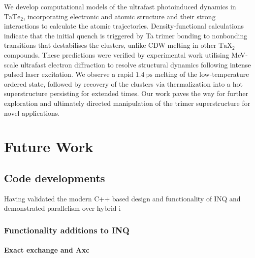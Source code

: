 We develop computational models of the ultrafast photoinduced dynamics in \(\mathrm{TaTe_2}\), incorporating  electronic and atomic structure and their strong interactions to calculate the atomic trajectories. 
Density-functional calculations indicate that the initial quench is triggered by Ta trimer bonding to nonbonding transitions that destabilises the clusters, unlike CDW melting in other \(\mathrm{TaX_2}\) compounds. 
These predictions were verified by experimental work utilising MeV-scale ultrafast electron diffraction to resolve structural dynamics following intense pulsed laser excitation. 
We observe a rapid \(1.4~\mathrm{ps}\) melting of the low-temperature ordered state, followed by recovery of the clusters via thermalization into a hot superstructure persisting for extended times.
Our work paves the way for further exploration and ultimately directed manipulation of the trimer superstructure for novel applications.

\section{Future Work}

\subsection{Code developments}
Having validated the modern C++ based design and functionality of \textsc{INQ} and demonstrated parallelism over hybrid i 
\subsubsection{Functionality additions to INQ}

\paragraph{Exact exchange and Axc}

